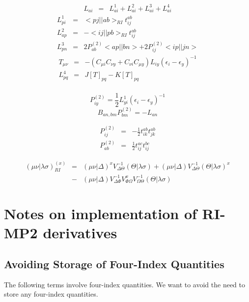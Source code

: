 \documentclass[fleqn,12pt]{article}
\newcommand{\half}{\frac{1}{2}}
\newcommand{\bra}{<\!}
\newcommand{\ket}{\!>}
\newcommand{\tijab}{{t_{ij}^{ab}}}
\newcommand{\Ptwo}{P^{(2)}}
\newcommand{\intari}[2]{\bra #1 || #2 \ket_{RI}}
\begin{document}
\begin{changebar}
\begin{eqnarray}
  L_{ai} & = & L^1_{ai} + L^2_{ai} + L^3_{ai} + L^4_{ai}
\end{eqnarray}
\begin{eqnarray}
  L^1_{pi} & = & \intari{pj}{ab} \tijab \\
  L^2_{ap} & = & - \intari{ij}{pb} \tijab \\
  L^3_{pn} & = & 2 \Ptwo_{ab} \bra ap || bn \ket + 2 \Ptwo_{ij} \bra ip
  || jn \ket 
\end{eqnarray}
\begin{eqnarray}
  T_{\mu \nu} & = & - \left(C_{\mu i} C_{\nu y} + C_{\nu i} C_{\mu y}
  \right) L_{iy} \left( \epsilon_i - \epsilon_y \right)^{-1} \\
  L^4_{pq} & = & J[T]_{pq} - K[T]_{pq}\\
\end{eqnarray}

\begin{equation}
  \Ptwo_{iy} = \half L^1_{yi} \left( \epsilon_i -  \epsilon_y  \right)^{-1}
\end{equation}
\begin{equation}
  B_{an,bm} \Ptwo_{bm} = -L_{an}
\end{equation}

\begin{eqnarray}
  \Ptwo_{ij} & = & -\half t_{ik}^{ab} t_{jk}^{ab} \\
  \Ptwo_{ab} & = & \half t_{ij}^{ac} t_{ij}^{bc} 
\end{eqnarray}

\begin{eqnarray}
( \mu\nu | \lambda\sigma )^{(x)}_{RI} & = &
   (\mu \nu | \Delta)^{x} V^{-1}_{\Delta\Theta} (\Theta | \lambda \sigma)
   + (\mu \nu | \Delta) V^{-1}_{\Delta\Theta} (\Theta | \lambda \sigma)^{x} \\
 & - & (\mu \nu | \Delta) V^{-1}_{\Delta\Phi} V^{x}_{\Phi\Omega}
             V^{-1}_{\Omega\Theta} (\Theta | \lambda \sigma) \nonumber
\end{eqnarray}

\section{Notes on implementation of RI-MP2 derivatives}

\subsection{Avoiding Storage of Four-Index Quantities}

The following terms involve four-index quantities.  We want to avoid
the need to store any four-index quantities.


\end{changebar}
\end{document}
